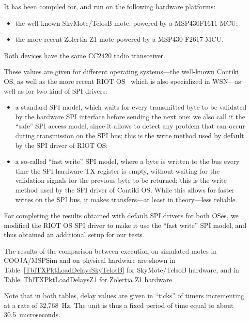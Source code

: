 \documentclass[10pt,final,journal,twocolumn]{IEEEtran}
\begin{document}
It has been compiled for, and run on the following hardware platforms:
\begin{itemize}
\item the well-known SkyMote/TelosB mote, powered by a MSP430F1611 MCU;
\item the more recent Zolertia Z1 mote powered by a MSP430 F2617 MCU.
\end{itemize}
Both devices have the same CC2420 radio transceiver.

These values are given for different operating systems---the well-known
Contiki OS, as well as the more recent RIOT OS~\cite{RIOT} which is also
specialized in WSN---as well as for two kind of SPI drivers:
\begin{itemize}
\item a standard SPI model, which waits for every transmitted byte to be
validated by the hardware SPI interface before sending the next one:
we also call it the ``safe'' SPI access model, since it allows to detect
any problem that can occur during transmission on the SPI bus; this is
the write method used by default by the SPI driver of RIOT OS;
\item a so-called ``fast write'' SPI model, where a byte is written to
the bus every time the SPI hardware TX register is empty, without waiting
for the validation signals for the previous byte to be returned; this is
the write method used by the SPI driver of Contiki OS. While this allows
for faster writes on the SPI bus, it makes transfers---at least in
theory---less reliable.
\end{itemize}

For completing the results obtained with default SPI drivers for both OSes,
we modified the RIOT OS SPI driver to make it use the ``fast write''
SPI model, and thus obtained an additional setup for our tests.

The results of the comparison between execution on simulated motes
in COOJA/MSPSim and on physical hardware are shown in
Table~\ref{TblTXPktLoadDelaysSkyTelosB} for SkyMote/TelsoB hardware,
and in Table~{TblTXPktLoadDelaysZ1} for Zolertia Z1 hardware.

Note that in both tables, delay values are given in ``ticks'' of timers
incrementing at a rate of 32,768~Hz. The unit is thus a fixed period of
time equal to about 30.5~microseconds.


\newcommand{\tabtitle}[1]{\multicolumn{7}{c}{\bfseries #1}}
\newcommand{\ticks}[1]{#1}
\newcommand{\moy}[1]{$\mu=$ \ticks{#1}}
\newcommand{\ect}[1]{$\sigma=$ \ticks{#1}}
\newcommand{\estus}[1]{($\approx$ #1 $\mu$sec.)}
\newcommand{\prctv}[1]{$\approx$ #1\% exp. value}
\end{document}
